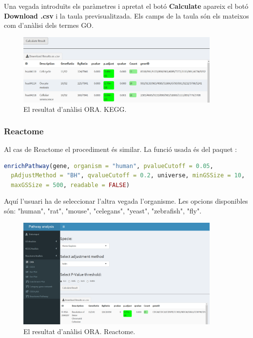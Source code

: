 \documentclass[]{article}
\begin{document}
Una vegada introduïts els paràmetres i apretat el botó \textbf{Calculate} apareix el botó \textbf{Download .csv} i la taula previsualitzada. Els camps de la taula són els mateixos com d'anàlisi dels termes GO.
 
\begin{figure}[H]
\centering
\includegraphics[width=0.9\textwidth]{App_F9_Items_KEGG_ORA_Table.png}  
\caption{El resultat d'anàlisi ORA. KEGG.}
\end{figure}

\subsubsection{Reactome}
Al cas de Reactome el procediment és similar. La funció usada és  del paquet :

\begin{lstlisting}[language=R]
enrichPathway(gene, organism = "human", pvalueCutoff = 0.05,
  pAdjustMethod = "BH", qvalueCutoff = 0.2, universe, minGSSize = 10,
  maxGSSize = 500, readable = FALSE)
\end{lstlisting}

Aquí l'usuari ha de seleccionar l'altra vegada l'organisme. Les opcions disponibles són: "human", "rat", "mouse", "celegans", "yeast", "zebrafish", "fly".

\begin{figure}[H]
\centering
\includegraphics[width=0.9\textwidth]{App_F10_Items_Reactome_ORA.png}  
\caption{El resultat d'anàlisi ORA. Reactome.}
\end{figure}
\end{document}
